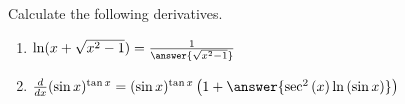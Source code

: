 \documentclass{ximera}
\author{Nela Lakos}
\begin{document}
\begin{exercise}

Calculate the following derivatives.
\begin{enumerate}
\item $\ln(x+\sqrt{x^2-1}) =\frac{1}{\answer{\sqrt{x^2-1}}}$\\
\item$ \ddx(\sin x)^{\tan{x}} = (\sin{x})^{\tan{x}}\left(1+\answer{\sec^2{(x)}\ln{(\sin{x})}}\right)$\\
\end{enumerate}
\end{exercise}
\end{document}
